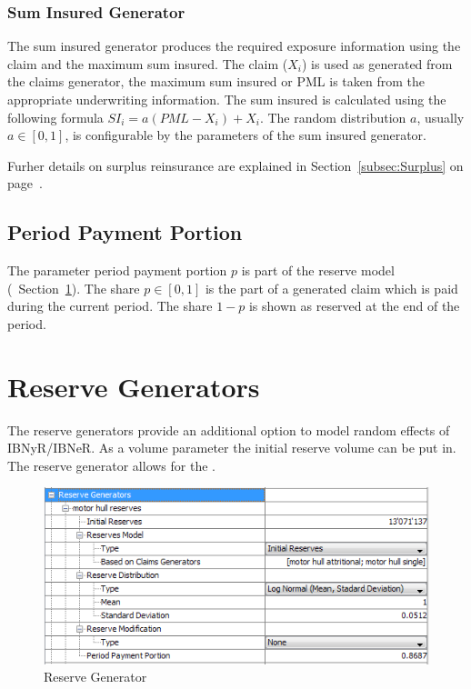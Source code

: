 \subsubsection*{Sum Insured Generator}
The sum insured generator produces the required exposure information using the claim and the maximum sum insured. The claim ($X_i$) is used as generated from the claims generator, the maximum sum insured or PML is taken from the appropriate underwriting information. The sum insured is calculated using the following formula $SI_i= a (PML-X_i)+X_i$. The random distribution $a$, usually $a\in [0,1]$, is configurable by the parameters of the sum insured generator. 

Furher details on surplus reinsurance are explained in Section~\ref{subsec:Surplus} on page~\pageref{subsec:Surplus}. 

\subsection{Period Payment Portion} 

The parameter period payment portion $p$ is part of the reserve model (\cf~Section~\ref{sec:ReserveGenerators}). The share $p\in[0,1]$ is the part of a generated claim which is paid during the current period. The share $1-p$ is shown as reserved at the end of the period.
 
\section{Reserve Generators}
\label{sec:ReserveGenerators}

The reserve generators provide an additional option to model random effects of IBNyR/IBNeR. 
As a volume parameter the initial reserve volume can be put in. The reserve generator allows for the .

\begin{figure}[htb]
	\centering
		\includegraphics[scale=0.6]{images/ReserveGenerator.png}
	\caption{Reserve Generator}
	\label{fig:ReserveGenerator}
\end{figure}

